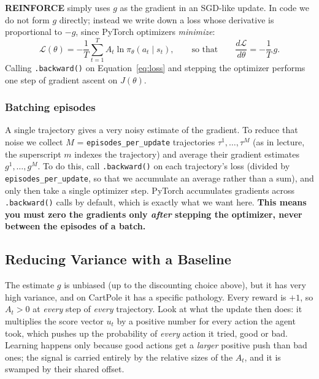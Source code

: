 \textbf{REINFORCE} simply uses $g$ as the gradient in an SGD-like update. In code
we do not form $g$ directly; instead we write down a loss whose derivative is
proportional to $-g$, since PyTorch optimizers \emph{minimize}:
\begin{equation}
    \label{eq:loss}
    \mathcal{L}(\theta) = -\frac{1}{T}\sum_{t=1}^{T} A_t \ln \pi_\theta(a_t \mid s_t),
    \qquad \text{so that} \qquad
    \frac{d\mathcal{L}}{d\theta} = -\frac{1}{T}\, g.
\end{equation}
Calling \verb|.backward()| on Equation~\ref{eq:loss} and stepping the optimizer
performs one step of gradient ascent on $J(\theta)$.

\subsubsection{Batching episodes}
\label{sec:batching}
A single trajectory gives a very noisy estimate of
the gradient. To reduce that noise we collect $M$ = \verb|episodes_per_update|
trajectories $\tau^1, \dots, \tau^M$ (as in lecture, the superscript $m$ indexes
the trajectory) and average their gradient estimates $g^1, \dots, g^M$. To do
this, call \verb|.backward()| on each trajectory's loss (divided by
\verb|episodes_per_update|, so that we accumulate an average rather than a sum),
and only then take a single optimizer step. PyTorch accumulates gradients across
\verb|.backward()| calls by default, which is exactly what we want here.
\textbf{This means you must zero the gradients only \emph{after} stepping the
optimizer, never between the episodes of a batch.}

\subsection{Reducing Variance with a Baseline}
\label{sec:baseline}

The estimate $g$ is unbiased (up to the discounting choice above), but it has
very high variance, and on CartPole it has a specific pathology. Every reward is
$+1$, so $A_t > 0$ at \emph{every} step of \emph{every} trajectory. Look at what
the update then does: it multiplies the score vector $u_t$ by a positive number
for every action the agent took, which pushes up the probability of
\emph{every} action it tried, good or bad. Learning happens only because good
actions get a \emph{larger} positive push than bad ones; the signal is carried
entirely by the relative sizes of the $A_t$, and it is swamped by their shared
offset.

